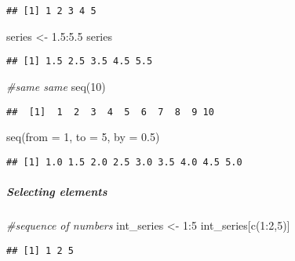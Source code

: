 \documentclass[
]{article}
\newenvironment{Shaded}{\begin{snugshade}}{\end{snugshade}}
\newcommand{\AttributeTok}[1]{\textcolor[rgb]{0.77,0.63,0.00}{#1}}
\newcommand{\CommentTok}[1]{\textcolor[rgb]{0.56,0.35,0.01}{\textit{#1}}}
\newcommand{\DecValTok}[1]{\textcolor[rgb]{0.00,0.00,0.81}{#1}}
\newcommand{\FloatTok}[1]{\textcolor[rgb]{0.00,0.00,0.81}{#1}}
\newcommand{\FunctionTok}[1]{\textcolor[rgb]{0.00,0.00,0.00}{#1}}
\newcommand{\NormalTok}[1]{#1}
\newcommand{\OtherTok}[1]{\textcolor[rgb]{0.56,0.35,0.01}{#1}}
\newcommand{\SpecialCharTok}[1]{\textcolor[rgb]{0.00,0.00,0.00}{#1}}
\begin{document}
\begin{verbatim}
## [1] 1 2 3 4 5
\end{verbatim}

\begin{Shaded}
\begin{Highlighting}[]
\NormalTok{series }\OtherTok{\textless{}{-}} \FloatTok{1.5}\SpecialCharTok{:}\FloatTok{5.5}
\NormalTok{series}
\end{Highlighting}
\end{Shaded}

\begin{verbatim}
## [1] 1.5 2.5 3.5 4.5 5.5
\end{verbatim}

\begin{Shaded}
\begin{Highlighting}[]
\CommentTok{\#same same}
\FunctionTok{seq}\NormalTok{(}\DecValTok{10}\NormalTok{)}
\end{Highlighting}
\end{Shaded}

\begin{verbatim}
##  [1]  1  2  3  4  5  6  7  8  9 10
\end{verbatim}

\begin{Shaded}
\begin{Highlighting}[]
\FunctionTok{seq}\NormalTok{(}\AttributeTok{from =} \DecValTok{1}\NormalTok{, }\AttributeTok{to =} \DecValTok{5}\NormalTok{, }\AttributeTok{by =} \FloatTok{0.5}\NormalTok{)}
\end{Highlighting}
\end{Shaded}

\begin{verbatim}
## [1] 1.0 1.5 2.0 2.5 3.0 3.5 4.0 4.5 5.0
\end{verbatim}

\hypertarget{selecting-elements}{%
\subparagraph{Selecting elements}\label{selecting-elements}}

\begin{Shaded}
\begin{Highlighting}[]
\CommentTok{\#sequence of numbers}
\NormalTok{int\_series }\OtherTok{\textless{}{-}} \DecValTok{1}\SpecialCharTok{:}\DecValTok{5}
\NormalTok{int\_series[}\FunctionTok{c}\NormalTok{(}\DecValTok{1}\SpecialCharTok{:}\DecValTok{2}\NormalTok{,}\DecValTok{5}\NormalTok{)]}
\end{Highlighting}
\end{Shaded}

\begin{verbatim}
## [1] 1 2 5
\end{verbatim}
\end{document}
